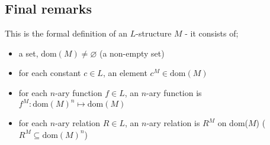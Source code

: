 \documentclass[a4paper, 12pt]{article}
\renewcommand{\emptyset}[0]{\varnothing}
\begin{document}
        \subsection*{Final remarks}
            This is the formal definition of an $L$-structure $M$ - it consists of;
            \begin{itemize}
                \itemsep0em
                \item a set, $\text{dom}(M) \neq \emptyset$ (a non-empty set)
                \item for each constant $c \in L$, an element $c^M \in \text{dom}(M)$
                \item for each $n$-ary function $f \in L$, an $n$-ary function is $f^M: \text{dom}(M)^n \mapsto \text{dom}(M)$
                \item for each $n$-ary relation $R \in L$, an $n$-ary relation is $R^M$ on dom($M$) ($R^M \subseteq \text{dom}(M)^n$)
            \end{itemize}
\end{document}
